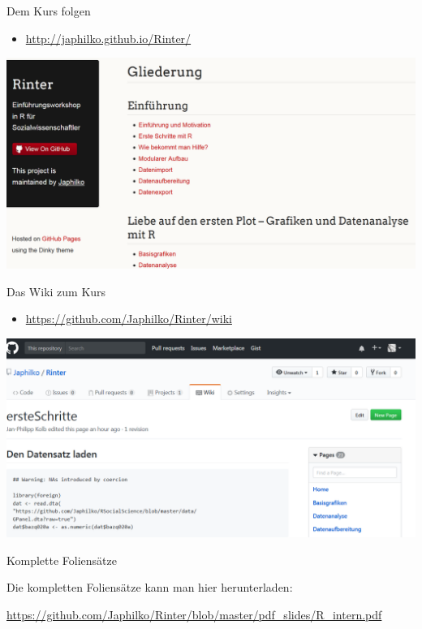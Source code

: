 \documentclass[ignorenonframetext,]{beamer}
\providecommand{\tightlist}{%
\setlength{\itemsep}{0pt}\setlength{\parskip}{0pt}}
\begin{document}
\begin{frame}{Dem Kurs folgen}

\begin{itemize}
\tightlist
\item
  \url{http://japhilko.github.io/Rinter/}
\end{itemize}

\includegraphics{./tex2pdf.956/e5396dc35519dd7e8a956d83df6bf7985683ee7e.png}

\end{frame}

\begin{frame}{Das Wiki zum Kurs}

\begin{itemize}
\tightlist
\item
  \url{https://github.com/Japhilko/Rinter/wiki}
\end{itemize}

\includegraphics{./tex2pdf.956/80526e6c59606398920d3ee118ec6748029b05d2.png}

\end{frame}

\begin{frame}{Komplette Foliensätze}

Die kompletten Foliensätze kann man hier herunterladen:

\url{https://github.com/Japhilko/Rinter/blob/master/pdf_slides/R_intern.pdf}

\end{frame}
\end{document}

